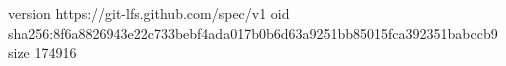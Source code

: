 version https://git-lfs.github.com/spec/v1
oid sha256:8f6a8826943e22c733bebf4ada017b0b6d63a9251bb85015fca392351babccb9
size 174916
